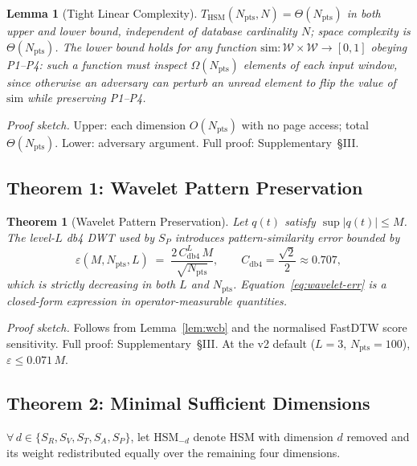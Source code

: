 \documentclass[10pt,twocolumn,a4paper]{article}
\newtheorem{theorem}{Theorem}
\newtheorem{lemma}{Lemma}
\newcommand{\SR}{S_{R}}
\newcommand{\SV}{S_{V}}
\newcommand{\ST}{S_{T}}
\newcommand{\SA}{S_{A}}
\newcommand{\SPER}{S_{P}}
\newcommand{\Npts}{N_{\mathrm{pts}}}
\begin{document}
\begin{lemma}[Tight Linear Complexity]\label{lem:complexity}
$T_{\mathrm{HSM}}(\Npts,N)\!=\!\Theta(\Npts)$ in both upper and lower
bound, independent of database cardinality $N$; space complexity is
$\Theta(\Npts)$. The lower bound holds for any function
$\mathrm{sim}:\mathcal{W}\times\mathcal{W}\!\to\![0,1]$ obeying P1--P4:
such a function must inspect $\Omega(\Npts)$ elements of each input
window, since otherwise an adversary can perturb an unread element to
flip the value of $\mathrm{sim}$ while preserving P1--P4.
\end{lemma}
\noindent\textit{Proof sketch.}
Upper: each dimension $O(\Npts)$ with no page access; total $\Theta(\Npts)$.
Lower: adversary argument. Full proof: Supplementary~\S III.

\subsection{Theorem 1: Wavelet Pattern Preservation}

\begin{theorem}[Wavelet Pattern Preservation]\label{thm:wavelet}
Let $q(t)$ satisfy $\sup|q(t)|\leq M$. The level-$L$ db4 DWT used by
$\SPER$ introduces pattern-similarity error bounded by
\begin{equation}\label{eq:wavelet-err}
  \varepsilon(M,\Npts,L)\;=\;\frac{2\,C_{\mathrm{db4}}^{L}\,M}{\sqrt{\Npts}},
  \qquad C_{\mathrm{db4}}=\frac{\sqrt{2}}{2}\approx 0.707,
\end{equation}
which is strictly decreasing in both $L$ and $\Npts$. Equation~\eqref{eq:wavelet-err}
is a closed-form expression in operator-measurable quantities.
\end{theorem}
\noindent\textit{Proof sketch.}
Follows from Lemma~\ref{lem:wcb} and the normalised FastDTW score sensitivity.
Full proof: Supplementary~\S III.
At the v2 default ($L\!=\!3$, $\Npts\!=\!100$), $\varepsilon\!\leq\!0.071\,M$.

\subsection{Theorem 2: Minimal Sufficient Dimensions}

$\forall\,d\!\in\!\{\SR,\SV,\ST,\SA,\SPER\}$, let $\mathrm{HSM}_{-d}$
denote HSM with dimension $d$ removed and its weight redistributed
equally over the remaining four dimensions.
\end{document}
